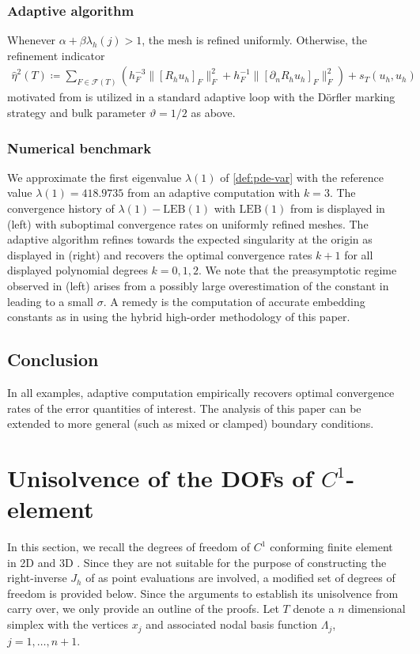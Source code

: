 \documentclass[a4paper]{amsart}
\numberwithin{equation}{section}
\def\F{\mathcal{F}}
\theoremstyle{definition}
\theoremstyle{remark}
\numberwithin{theorem}{section}
\numberwithin{equation}{section}
\numberwithin{table}{section}
\numberwithin{figure}{section}
\begin{document}
\subsubsection{Adaptive algorithm}
Whenever $\alpha + \beta \lambda_h(j) > 1$, the mesh is refined uniformly.
Otherwise,
the refinement indicator
\begin{align*}
	\widehat{\eta}^2(T) \coloneqq \sum_{F \in \F(T)} (h_F^{-3} \|[R_h u_h]_F\|_F^2 + h_F^{-1} \|[\partial_n R_h u_h]_F\|_F^2)
	+ s_T(u_h,u_h)
\end{align*}
motivated from 
is utilized in a standard adaptive loop with the D\"orfler marking strategy and bulk parameter $\vartheta = 1/2$ as above.

\subsubsection{Numerical benchmark}
We approximate the first eigenvalue $\lambda(1)$ of \eqref{def:pde-var} with the reference value $\lambda(1) = 418.9735$ from an adaptive computation with $k = 3$.
The convergence history of $\lambda(1) - \mathrm{LEB}(1)$ with $\mathrm{LEB}(1)$ from  is displayed in  (left) with suboptimal convergence rates on uniformly refined meshes. The adaptive algorithm refines towards the expected singularity at the origin as displayed in  (right) and recovers the optimal convergence rates $k+1$ for all displayed polynomial degrees $k = 0, 1, 2$. We note that the preasymptotic regime observed in  (left)
arises from a possibly large overestimation of the constant in  leading to a small $\sigma$.
A remedy is the computation of accurate embedding constants as in \cite{Tran2024x2} using the hybrid high-order methodology of this paper.

\subsection{Conclusion}
In all examples, adaptive computation empirically recovers optimal convergence rates of the error quantities of interest. The analysis of this paper can be extended to more general (such as mixed or clamped) boundary conditions.

\appendix
\section{Unisolvence of the DOFs of $C^1$-element}\label{appendix}
In this section, we recall the degrees of freedom of $C^1$ conforming finite element in 2D \cite{Ciarlet2002} and 3D \cite{Zenisek1973,Zhang2009}. Since they are not suitable for the purpose of constructing the right-inverse $J_h$ of  as point evaluations are involved, a modified set of degrees of freedom is provided below. Since the arguments to establish its unisolvence from \cite{Ciarlet2002,Zhang2009} carry over, we only provide an outline of the proofs.
Let $T$ denote a $n$ dimensional simplex with the vertices $x_j$ and associated nodal basis function $\Lambda_j$, $j = 1, \dots, n+1$.
\end{document}
